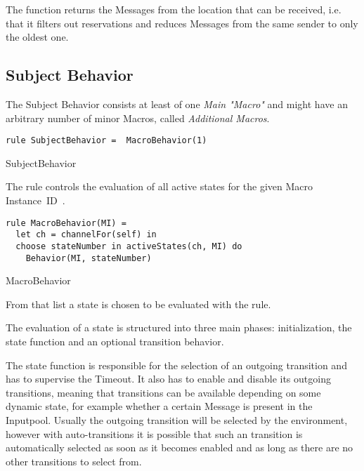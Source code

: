 The function  returns the Messages from the location  that can be received, i.e. that it filters out reservations and reduces Messages from the same sender to only the oldest one.

\subsection{Subject Behavior}

The Subject Behavior consists at least of one \textit{Main "Macro"} and might have an arbitrary number of minor Macros, called \textit{Additional Macros}. 


\begin{listing}[htbp]
\begin{verbatim} 
rule SubjectBehavior =  MacroBehavior(1)
\end{verbatim}
\caption{SubjectBehavior}
\label{lst:shortasm:SubjectBehavior}
\end{listing}




The  rule controls the evaluation of all active states for the given Macro Instance~ID~.


\begin{listing}[htbp]
\begin{verbatim}
rule MacroBehavior(MI) =
  let ch = channelFor(self) in
  choose stateNumber in activeStates(ch, MI) do
    Behavior(MI, stateNumber)
\end{verbatim}
\caption{MacroBehavior}
\label{lst:shortasm:MacroBehavior}
\end{listing}

From that list a state  is chosen to be evaluated with the  rule.


The evaluation of a state is structured into three main phases: initialization, the state function and an optional transition behavior.

The state function is responsible for the selection of an outgoing transition and has to supervise the Timeout. It also has to enable and disable its outgoing transitions, meaning that transitions can be available depending on some dynamic state, for example whether a certain Message is present in the Inputpool. Usually the outgoing transition will be selected by the environment, however with auto-transitions it is possible that such an transition is automatically selected as soon as it becomes enabled and as long as there are no other transitions to select from.


